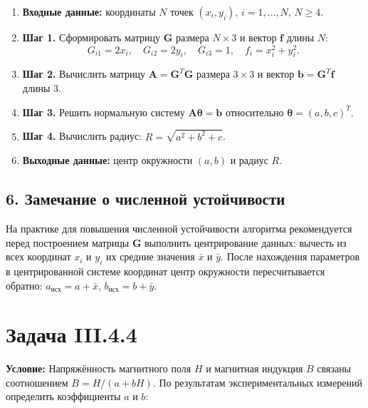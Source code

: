 \documentclass{article}
\begin{document}
\begin{enumerate}
\item \textbf{Входные данные:} координаты $N$ точек $(x_i, y_i)$, $i = 1, \ldots, N$, $N \geqslant 4$.

\item \textbf{Шаг 1.} Сформировать матрицу $\mathbf{G}$ размера $N \times 3$ и вектор $\mathbf{f}$ длины $N$:
\begin{equation}
G_{i1} = 2x_i, \quad G_{i2} = 2y_i, \quad G_{i3} = 1, \quad f_i = x_i^2 + y_i^2.
\end{equation}

\item \textbf{Шаг 2.} Вычислить матрицу $\mathbf{A} = \mathbf{G}^T \mathbf{G}$ размера $3 \times 3$ и вектор $\mathbf{b} = \mathbf{G}^T \mathbf{f}$ длины $3$.

\item \textbf{Шаг 3.} Решить нормальную систему $\mathbf{A} \boldsymbol{\theta} = \mathbf{b}$ относительно $\boldsymbol{\theta} = (a, b, c)^T$.

\item \textbf{Шаг 4.} Вычислить радиус: $R = \sqrt{a^2 + b^2 + c}$.

\item \textbf{Выходные данные:} центр окружности $(a, b)$ и радиус $R$.
\end{enumerate}

\subsection*{6. Замечание о численной устойчивости}

На практике для повышения численной устойчивости алгоритма рекомендуется перед построением матрицы $\mathbf{G}$ выполнить центрирование данных: вычесть из всех координат $x_i$ и $y_i$ их средние значения $\bar{x}$ и $\bar{y}$. После нахождения параметров в центрированной системе координат центр окружности пересчитывается обратно: $a_{\text{исх}} = a + \bar{x}$, $b_{\text{исх}} = b + \bar{y}$.

\newpage



\section*{Задача III.4.4}

\textbf{Условие:} Напряжённость магнитного поля $H$ и магнитная индукция $B$ связаны соотношением $B = H/(a + bH)$. По результатам экспериментальных измерений определить коэффициенты $a$ и $b$:
\end{document}
